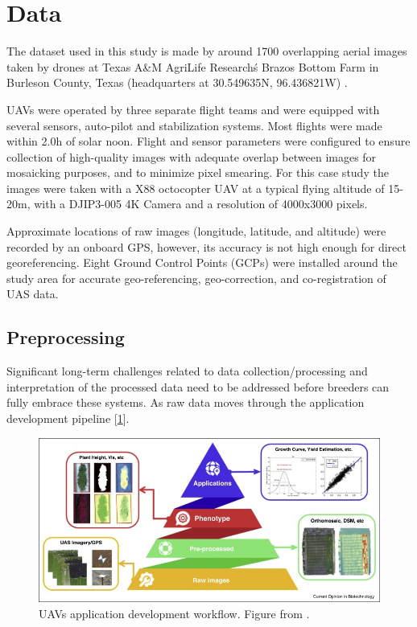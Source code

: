 \section{Data}
\label{sec:data}

The dataset used in this study is made by around 1700 overlapping aerial images taken by drones at Texas A\&M AgriLife Research\'s Brazos Bottom Farm in Burleson County, Texas (headquarters at 30.549635N, 96.436821W) \cite{shi_2021_5089956}.

UAVs were operated by three separate flight teams and were equipped with several sensors, auto-pilot and stabilization systems.
Most flights were made within 2.0h of solar noon. Flight and sensor parameters were configured to ensure collection of high-quality images with adequate overlap between images for mosaicking purposes, and to minimize pixel smearing.
For this case study the images were taken with a X88 octocopter UAV at a typical flying altitude of 15-20m, with a DJIP3-005 4K Camera and a resolution of 4000x3000 pixels.

Approximate locations of raw images (longitude, latitude, and altitude) were recorded by an onboard GPS, however, its accuracy is not high enough for direct georeferencing. Eight Ground Control Points (GCPs) were installed around the study area for accurate geo-referencing, geo-correction, and co-registration of UAS data.

\subsection{Preprocessing}
\label{sec:preprocessing}

Significant long-term challenges related to data collection/processing and interpretation of the processed data need to be addressed before breeders can fully embrace these systems. As raw data moves through the application development pipeline [\ref{fig:dev_pipeline}].
\begin{figure}[h!]
    \includegraphics[width=\linewidth]{../images/dev_pipeline} 
    \caption{UAVs application development workflow. Figure from \cite{jung2021potential}.}
    \label{fig:dev_pipeline}
\end{figure}

